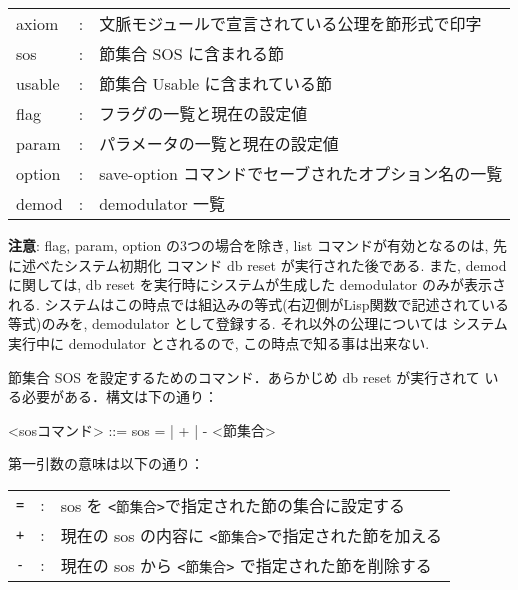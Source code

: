 \begin{description}
 {\small
  \begin{center}
  \begin{tabular}{|lcl|}\hline
    axiom       &:& 文脈モジュールで宣言されている公理を節形式で印字\\
    sos         &:& 節集合 SOS に含まれる節\\
    usable      &:& 節集合 Usable に含まれている節\\
    flag        &:& フラグの一覧と現在の設定値\\
    param       &:& パラメータの一覧と現在の設定値\\
    option      &:& save-option コマンドでセーブされたオプション名の一覧\\
    demod      &:& demodulator 一覧 \\\hline
  \end{tabular}
  \end{center}
  }

  \begin{description}
  \item{\textbf{注意}}: flag, param, option の3つの場合を除き,
  list コマンドが有効となるのは, 先に述べたシステム初期化
  コマンド db reset が実行された後である. また, demod に関しては,
  db reset を実行時にシステムが生成した demodulator のみが表示される.
  システムはこの時点では組込みの等式(右辺側がLisp関数で記述されている
  等式)のみを, demodulator として登録する. それ以外の公理については
  システム実行中に demodulator とされるので, この時点で知る事は出来ない.
\end{description}

\item[sos コマンド]

  節集合 SOS を設定するためのコマンド．あらかじめ db reset が実行されて
  いる必要がある．構文は下の通り：

\begin{vvtm}
\begin{simplev}
   <sosコマンド> ::= sos { = | + | - } <節集合>
\end{simplev}
\end{vvtm}

第一引数の意味は以下の通り：

  \begin{center}
    \begin{tabular}{|lcl|}\hline
      \texttt{=}
      &:& sos を \texttt{<節集合>}で指定された節の集合に設定する\\
      \verb|+|     
      &:& 現在の sos の内容に \texttt{<節集合>}で指定された節を加える\\
      \verb|-|     
      &:& 現在の sos から \texttt{<節集合>} で指定された節を削除する\\\hline
    \end{tabular}
  \end{center}


\end{description}
